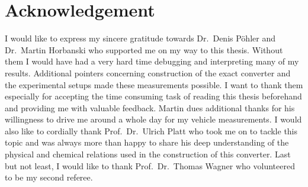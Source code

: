 \section{Acknowledgement}
\label{sec:acknowledgement}

I would like to express my sincere gratitude towards Dr.\ Denis Pöhler
and Dr.\ Martin Horbanski who supported me on my way to this
thesis. Without them I would have had a very hard time debugging and
interpreting many of my results. Additional pointers concerning
construction of the exact converter and the experimental setups made
these measurements possible. I want to thank them especially for
accepting the time consuming task of reading this thesis beforehand
and providing me with valuable feedback. Martin dues additional thanks
for his willingness to drive me around a whole day for my vehicle
measurements. I would also like to cordially thank Prof.\ Dr.\ Ulrich
Platt who took me on to tackle this topic and was always more than
happy to share his deep understanding of the physical and chemical
relations used in the construction of this converter. Last but not
least, I would like to thank Prof.\ Dr.\ Thomas Wagner who volunteered
to be my second referee.

